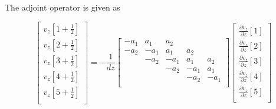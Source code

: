 \documentclass[revised,endfloat]{geophysics}
\begin{document}
The adjoint operator is given as

\begin{equation}
\begin{bmatrix}
v_z[1+\frac{1}{2}] \\
v_z[2+\frac{1}{2}] \\
v_z[3+\frac{1}{2}] \\
v_z[4+\frac{1}{2}] \\
v_z[5+\frac{1}{2}] \\
\end{bmatrix}
= - \frac{1}{dz}\begin{bmatrix}
-a_1 & a_1 & a_2 & & \\
-a_2 & -a_1 & a_1 & a_2 &   \\
& -a_2 & -a_1 & a_1 & a_2  \\
& & -a_2 & -a_1 & a_1  \\
& & & -a_2 & -a_1  \\
\end{bmatrix}
\begin{bmatrix}
\frac{\partial v_z}{\partial z}[1] \\
\frac{\partial v_z}{\partial z}[2] \\
\frac{\partial v_z}{\partial z}[3] \\
\frac{\partial v_z}{\partial z}[4] \\
\frac{\partial v_z}{\partial z}[5] \\
\end{bmatrix}
\label{eq31}
\end{equation}
\end{document}
